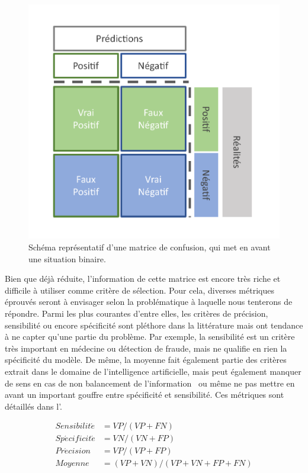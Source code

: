 \begin{figure}[H]
    \centering
    \includegraphics[width=0.6\linewidth]{contents/chapter_3/resources/scheme_confusion_matrix.pdf}
    \caption{Schéma représentatif d’une matrice de confusion, qui met en avant une situation binaire.}
    \label{fig:scheme_confusion_matrix}
\end{figure}

Bien que déjà réduite, l'information de cette matrice est encore très riche et difficile à utiliser comme critère de sélection. Pour cela, diverses métriques éprouvés seront à envisager selon la problématique à laquelle nous tenterons de répondre. Parmi les plus courantes d'entre elles, les critères de précision, sensibilité ou encore spécificité sont pléthore dans la littérature mais ont tendance à ne capter qu'une partie du problème. Par exemple, la sensibilité est un critère très important en médecine ou détection de fraude, mais ne qualifie en rien la spécificité du modèle. De même, la moyenne fait également partie des critères extrait dans le domaine de l'intelligence artificielle, mais peut également manquer de sens en cas de non balancement de l'information~\cite{Guo2008} ou même ne pas mettre en avant un important gouffre entre spécificité et sensibilité. Ces métriques sont détaillés dans l'.\par

\begin{equation} 
    \label{eq:metrics_basics}
    \begin{split}
    Sensibilit\acute{e} &= VP/(VP+FN) \\	
    Sp\acute{e}cificit\acute{e} &=  VN/(VN+FP) \\
    Pr\acute{e}cision &= VP/(VP+FP) \\
    Moyenne &= (VP+VN)/(VP+VN+FP+FN)
    \end{split}
\end{equation}

